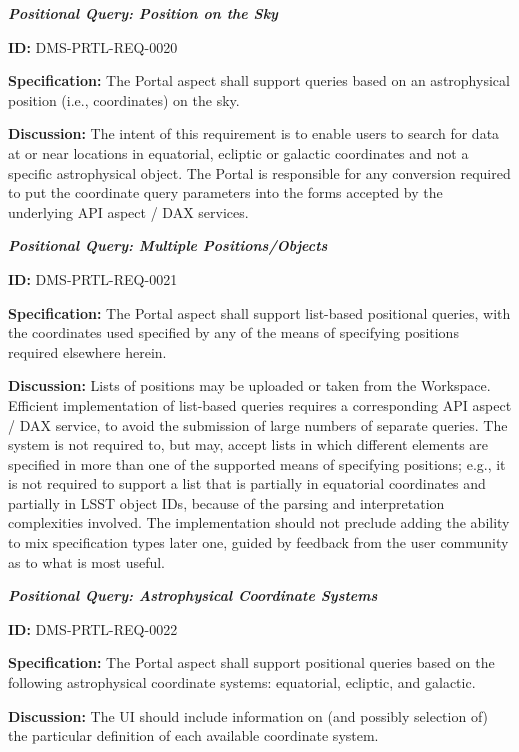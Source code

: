\documentclass[SE,toc]{lsstdoc}
\begin{document}
\textbf{\textit{Positional Query: Position on the Sky}}

\label{DMS-PRTL-REQ-0020}
\textbf{ID:} DMS-PRTL-REQ-0020

\textbf{Specification:}
The Portal aspect shall support queries based on an astrophysical position (i.e., coordinates) on the sky.

\textbf{Discussion:}
The intent of this requirement is to enable users to search for data at or near locations in equatorial, ecliptic or galactic coordinates and not a specific astrophysical object.
The Portal is responsible for any conversion required to put the coordinate query parameters into the forms accepted by the underlying API aspect / DAX services.

\textbf{\textit{Positional Query: Multiple Positions/Objects}}

\label{DMS-PRTL-REQ-0021}
\textbf{ID:} DMS-PRTL-REQ-0021

\textbf{Specification:}
The Portal aspect shall support list-based positional queries, with the coordinates used specified by any of the means of specifying positions required elsewhere herein.

\textbf{Discussion:}
Lists of positions may be uploaded or taken from the Workspace.  Efficient implementation of list-based queries requires a corresponding API aspect / DAX service, to avoid the submission of large numbers of separate queries.
The system is not required to, but may, accept lists in which different elements are specified in more than one of the supported means of specifying positions; e.g., it is not required to support a list that is partially in equatorial coordinates and partially in LSST object IDs, because of the parsing and interpretation complexities involved.  The implementation should not preclude adding the ability to mix specification types later one, guided by feedback from the user community as to what is most useful.

\textbf{\textit{Positional Query: Astrophysical Coordinate Systems}}

\label{DMS-PRTL-REQ-0022}
\textbf{ID:} DMS-PRTL-REQ-0022

\textbf{Specification:}
The Portal aspect shall support positional queries based on the following astrophysical coordinate systems: equatorial, ecliptic, and galactic.

\textbf{Discussion:}
The UI should include information on (and possibly selection of) the particular definition of each available coordinate system.
\end{document}
